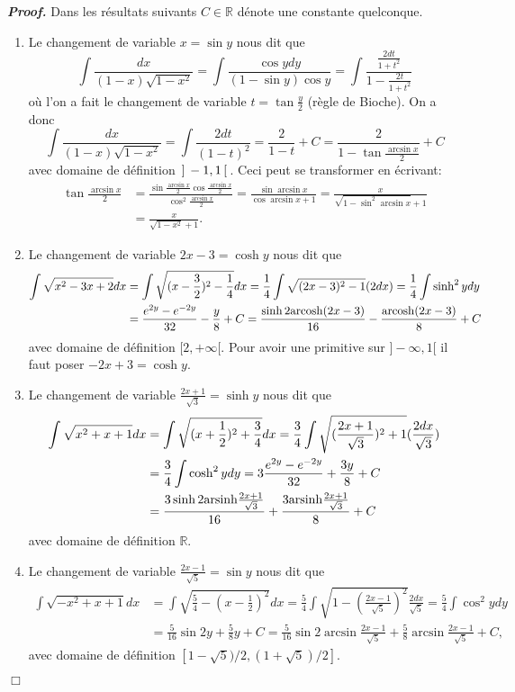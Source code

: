 \documentclass[11pt,a4paper]{article}
\newcommand{\RR}{\mathbb{R}}
\newcommand{\R}{\RR}
\newenvironment{preuve}[1][]
{\vskip 2mm  \noindent\emph{\bf Proof#1. }}{$\Box$ \vskip 2mm}
\begin{document}
\begin{preuve}
Dans les résultats suivants $C \in \R$ dénote une constante quelconque. 
\begin{enumerate}
\item Le changement de variable $x  = \sin y$ nous dit que 
\[     \int \frac{dx}{(1-x)\sqrt{1-x^2}} =  \int \frac{\cos y dy}{(1-\sin y)\cos y} = \int \frac{\frac{2dt}{1+t^2}}{1-\frac{2t}{1+t^2}}\]
où l'on a fait le changement de variable $t=\tan\frac{y}2$ (règle de Bioche). On a donc
\[     \int \frac{dx}{(1-x)\sqrt{1-x^2}} = \int \frac{2dt}{(1-t)^2} = \frac2{1-t}+C=  \frac2{1-\tan\frac{\arcsin x}2}+C  \]
avec domaine de définition $\hskip 0.6mm ]\hskip 0.6mm -1,1\hskip 0.6mm[\hskip 0.6mm$. Ceci peut se transformer en écrivant:
\begin{align*}
 \tan\frac{\arcsin x}2 &= \frac{\sin\frac{\arcsin x}2 \cos\frac{\arcsin x}2}{\cos^2\frac{\arcsin x}2}=\frac{\sin \arcsin x}{\cos \arcsin x+1}=\frac{x}{\sqrt{1-\sin^2 \arcsin x }+1}\\
 &=\frac{x}{\sqrt{1- x ^2}+1}.
\end{align*}


\item Le changement de variable $2x-3  = \cosh y$ nous dit que 
\begin{align*}     
\int \sqrt{x^2-3x+2} dx &= \int \sqrt{ (x-\frac32)^2-\frac14} dx = \frac14\int \sqrt{ (2x-3)^2-1} (2dx) =\frac14\int \sinh^2 y dy 
\\
&=\frac{e^{2y}-e^{-2y}}{32} -\frac{y}8+C = \frac{\sinh 2{\rm arcosh} (2x-3)}{16}- \frac{{\rm arcosh} (2x-3)}{8} +C
\end{align*}
avec domaine de définition $[2,+\infty[$. Pour avoir une primitive sur $]-\infty,1[$ il faut poser $-2x+3  = \cosh y$.

\item Le changement de variable $\frac{2x+1}{\sqrt3}  = \sinh y$ nous dit que 
\begin{align*}     \int \sqrt{x^2+x+1} dx &=  \int \sqrt{ (x+\frac12)^2+\frac34} dx = \frac{3}4\int \sqrt{ (\frac{2x+1}{\sqrt3})^2+1} (\frac{2dx}{\sqrt3})\\
& =\frac34\int \cosh^2 y dy =3\frac{e^{2y}-e^{-2y}}{32} +\frac{3y}8+C \\
&= \frac{3\sinh 2{\rm arsinh} \frac{2x+1}{\sqrt3} }{16}+ \frac{3{\rm arsinh} \frac{2x+1}{\sqrt3} }{8} +C
\end{align*}
avec domaine de définition $\R$. 

\item Le changement de variable $\frac{2x-1}{\sqrt 5}  = \sin y$ nous dit que 
\begin{align*}    
 \int \sqrt{-x^2+x+1} dx &=  \int \sqrt{\frac54 -(x-\frac12)^2} dx =\frac54 \int \sqrt{1 -(\frac{2x-1}{\sqrt 5})^2} \frac{2dx}{\sqrt5} = 
\frac54 \int \cos^2 y dy \\
&=\frac5{16} \sin2y +\frac58y+C  =\frac5{16} \sin2\arcsin\frac{2x-1}{\sqrt 5} +\frac58\arcsin\frac{2x-1}{\sqrt 5}+C  ,     
\end{align*}
avec domaine de définition $[1-\sqrt{5})/2,(1+\sqrt{5})/2]$. 
\end{enumerate}
\end{preuve}
\end{document}
